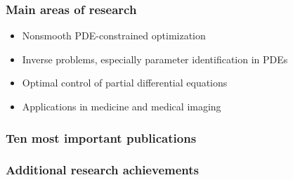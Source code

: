 \subsubsection*{Main areas of research}

\begin{itemize}
    \item{Nonsmooth PDE-constrained optimization}
    \item{Inverse problems, especially parameter identification in PDEs}
    \item{Optimal control of partial differential equations}
    \item{Applications in medicine and medical imaging}
\end{itemize}


\subsubsection*{Ten most important publications}


\nocite{cc:COCV:2009a}
\nocite{cc:MAGMA:2010b}
\nocite{cc:AO:2010a}
\nocite{cc:MRM:2011a}
\nocite{cc:SIIMS:2011a}
\nocite{cc:SICON:2012}
\nocite{cc:IP:2015}
\nocite{cc:JMR:2015}
\nocite{cc:MCRF:2017}
\nocite{cc:SIREV:2021}

\begin{refcontext}[sorting=nyt,labelprefix=CC]
    \printbibliography[heading=none]
\end{refcontext}

\endrefsection

\subsubsection*{Additional research achievements}


